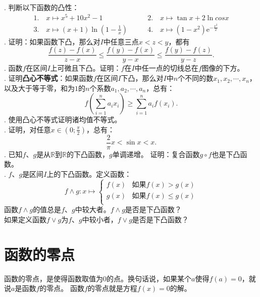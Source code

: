 \documentclass[12pt,UTF8,fontset=none]{ctexbook}
\begin{document}
\begin{xt}
    \mbox{} \\
    . 判断以下函数的凸性：
    $$
    \begin{array}{ll}
        1. \quad x \mapsto x^5 + 10x^2 - 1 \qquad &2. \quad x \mapsto \tan{x} + 2\ln{cos{x}} \\
        3. \quad x \mapsto (x+1)\ln{\left(1 - \frac{1}{x}\right)} \qquad &4. \quad x \mapsto \left(1 - x^2\right)\mathrm{e}^{-\frac{x^2}{2}}
    \end{array}
    $$
    . 证明：如果函数下凸，那么对$I$中任意三点$x < z < y$，都有
    $$ \frac{f(z) - f(x)}{z - x} \leqslant \frac{f(y) - f(x)}{y - x}  \leqslant \frac{f(y) - f(z)}{y - z}. $$
    . 函数$f$在区间$I$上可微且下凸。证明：$f$在$I$中任一点的切线总在$f$图像的下方。\\
    . 证明\textbf{凸心不等式}：如果函数$f$在区间$I$下凸，那么对$I$中$n$个不同的数$x_1, x_2, \cdots , x_n$，
    以及大于等于零，和为$1$的$n$个系数$a_1, a_2, \cdots, a_n$，总有：
    $$ f\left(\sum_{i=1}^n a_i x_i\right) \geqslant \sum_{i=1}^n a_i f(x_i). $$
    . 使用凸心不等式证明诸均值不等式。\\
    . 证明，对任意$x\in\left(0; \frac{\pi}{2}\right)$，总有：
    $$ \frac{2}{\pi} x < \sin{x} < x.$$
    . 已知$f$、$g$是从$\mathbb{R}$到$\mathbb{R}$的下凸函数，$g$单调递增。
    证明：复合函数$g\circ f$也是下凸函数。\\
    . $f$、$g$是区间$I$上的下凸函数。定义函数：
    $$ f \wedge g : x \mapsto \left\{
        \begin{array}{cl}
            f(x) & \mbox{如果} f(x) > g(x) \\
            g(x) & \mbox{如果} f(x) \leqslant g(x) \\
        \end{array}
    \right.
    $$
    \indent 函数$f \wedge g$的值总是$f$、$g$中较大者。$f \wedge g$是否是下凸函数？\\
    \indent 如果定义函数$f \vee g$为$f$、$g$中较小者，$f \vee g$是否是下凸函数？

\end{xt}

\section{函数的零点}

函数的零点，是使得函数取值为$0$的点。换句话说，如果某个$a$使得$f(a) = 0$，就说$a$是函数$f$的零点。
函数$f$的零点就是方程$f(x) = 0$的解。
\end{document}
